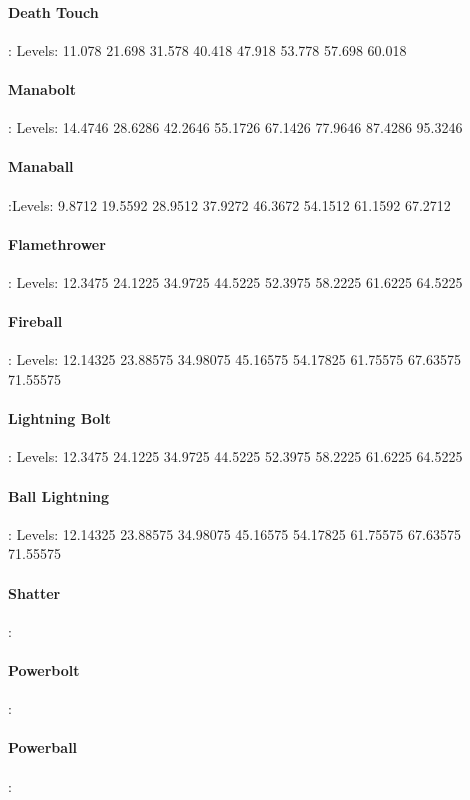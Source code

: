 \begin{multicols*}{2}
	\paragraph{Death Touch}: Levels: 11.078 21.698 31.578 40.418 47.918 53.778 57.698 60.018
	
	\paragraph{Manabolt}: Levels: 14.4746 28.6286 42.2646 55.1726 67.1426 77.9646 87.4286 95.3246
	
	\paragraph{Manaball}:Levels: 9.8712 19.5592 28.9512 37.9272 46.3672 54.1512 61.1592 67.2712
	
	\paragraph{Flamethrower}: Levels: 12.3475 24.1225 34.9725 44.5225 52.3975 58.2225 61.6225 64.5225
	
	\paragraph{Fireball}: Levels: 12.14325 23.88575 34.98075 45.16575 54.17825 61.75575 67.63575 71.55575
	
	\paragraph{Lightning Bolt}: Levels: 12.3475 24.1225 34.9725 44.5225 52.3975 58.2225 61.6225 64.5225
	
	\paragraph{Ball Lightning}: Levels: 12.14325 23.88575 34.98075 45.16575 54.17825 61.75575 67.63575 71.55575
	
	\paragraph{Shatter}:
	\paragraph{Powerbolt}:
	\paragraph{Powerball}:

\end{multicols*}
